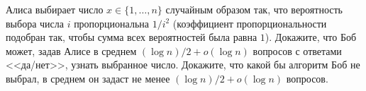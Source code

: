 Алиса выбирает число $x \in \{1, \dots, n\}$ случайным образом так, что вероятность выбора числа $i$
пропорциональна $1 / i^2$ (коэффициент пропорциональности подобран так, чтобы сумма всех вероятностей
была равна $1$). Докажите, что Боб может, задав Алисе в среднем $(\log n) / 2 + o(\log n)$ вопросов с
ответами <<да/нет>>, узнать выбранное число. Докажите, что какой бы алгоритм Боб не выбрал, в среднем он
задаст не менее $(\log n) / 2 + o(\log n)$ вопросов.
